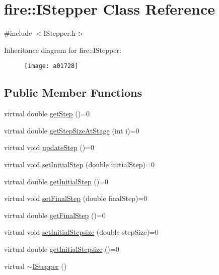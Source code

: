 \hypertarget{a01728}{}\section{fire\+:\+:I\+Stepper Class Reference}
\label{a01728}


{\ttfamily \#include $<$I\+Stepper.\+h$>$}

Inheritance diagram for fire\+:\+:I\+Stepper\+:\begin{figure}[H]
\begin{center}
\leavevmode
\texttt{[image: a01728]}
\end{center}
\end{figure}
\subsection*{Public Member Functions}
\begin{DoxyCompactItemize}
\item 
virtual double \hyperlink{a01728_a7f709d1462a2a3b8bd8214cc681ca26e}{get\+Step} ()=0
\item 
virtual double \hyperlink{a01728_a43027c0c268afcd59db8815c2e2c41ea}{get\+Step\+Size\+At\+Stage} (int i)=0
\item 
virtual void \hyperlink{a01728_a44dfccb90ee5ef6e080b54113c215458}{update\+Step} ()=0
\item 
virtual void \hyperlink{a01728_a3a5099cd0f3c874e56c33cb8f13b8f3b}{set\+Initial\+Step} (double initial\+Step)=0
\item 
virtual double \hyperlink{a01728_a49df3a2ac05cebaf2baf387b66d19272}{get\+Initial\+Step} ()=0
\item 
virtual void \hyperlink{a01728_add76974a7b6fbbc93916270a376c461e}{set\+Final\+Step} (double final\+Step)=0
\item 
virtual double \hyperlink{a01728_ab234d9f032e02668aededf1c22e8c0a9}{get\+Final\+Step} ()=0
\item 
virtual void \hyperlink{a01728_a69c262f248511efcd271be1724a41ad9}{set\+Initial\+Stepsize} (double step\+Size)=0
\item 
virtual double \hyperlink{a01728_afb777e62386b25e5a38d59af54972690}{get\+Initial\+Stepsize} ()=0
\item 
virtual \hyperlink{a01728_ac8ec460d35512e2e039396d5192eb57e}{$\sim$\+I\+Stepper} ()
\end{DoxyCompactItemize}


